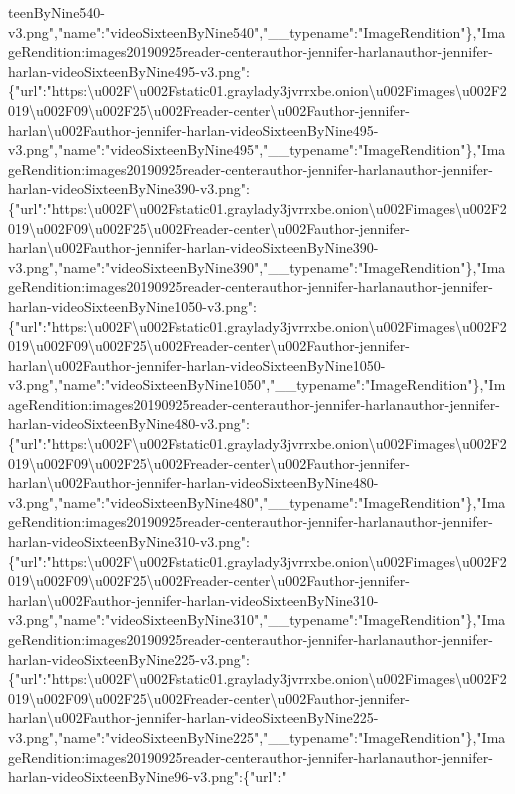 teenByNine540-v3.png","name":"videoSixteenByNine540","\_\_typename":"ImageRendition"\},"ImageRendition:images20190925reader-centerauthor-jennifer-harlanauthor-jennifer-harlan-videoSixteenByNine495-v3.png":\{"url":"https:\textbackslash{}u002F\textbackslash{}u002Fstatic01.graylady3jvrrxbe.onion\textbackslash{}u002Fimages\textbackslash{}u002F2019\textbackslash{}u002F09\textbackslash{}u002F25\textbackslash{}u002Freader-center\textbackslash{}u002Fauthor-jennifer-harlan\textbackslash{}u002Fauthor-jennifer-harlan-videoSixteenByNine495-v3.png","name":"videoSixteenByNine495","\_\_typename":"ImageRendition"\},"ImageRendition:images20190925reader-centerauthor-jennifer-harlanauthor-jennifer-harlan-videoSixteenByNine390-v3.png":\{"url":"https:\textbackslash{}u002F\textbackslash{}u002Fstatic01.graylady3jvrrxbe.onion\textbackslash{}u002Fimages\textbackslash{}u002F2019\textbackslash{}u002F09\textbackslash{}u002F25\textbackslash{}u002Freader-center\textbackslash{}u002Fauthor-jennifer-harlan\textbackslash{}u002Fauthor-jennifer-harlan-videoSixteenByNine390-v3.png","name":"videoSixteenByNine390","\_\_typename":"ImageRendition"\},"ImageRendition:images20190925reader-centerauthor-jennifer-harlanauthor-jennifer-harlan-videoSixteenByNine1050-v3.png":\{"url":"https:\textbackslash{}u002F\textbackslash{}u002Fstatic01.graylady3jvrrxbe.onion\textbackslash{}u002Fimages\textbackslash{}u002F2019\textbackslash{}u002F09\textbackslash{}u002F25\textbackslash{}u002Freader-center\textbackslash{}u002Fauthor-jennifer-harlan\textbackslash{}u002Fauthor-jennifer-harlan-videoSixteenByNine1050-v3.png","name":"videoSixteenByNine1050","\_\_typename":"ImageRendition"\},"ImageRendition:images20190925reader-centerauthor-jennifer-harlanauthor-jennifer-harlan-videoSixteenByNine480-v3.png":\{"url":"https:\textbackslash{}u002F\textbackslash{}u002Fstatic01.graylady3jvrrxbe.onion\textbackslash{}u002Fimages\textbackslash{}u002F2019\textbackslash{}u002F09\textbackslash{}u002F25\textbackslash{}u002Freader-center\textbackslash{}u002Fauthor-jennifer-harlan\textbackslash{}u002Fauthor-jennifer-harlan-videoSixteenByNine480-v3.png","name":"videoSixteenByNine480","\_\_typename":"ImageRendition"\},"ImageRendition:images20190925reader-centerauthor-jennifer-harlanauthor-jennifer-harlan-videoSixteenByNine310-v3.png":\{"url":"https:\textbackslash{}u002F\textbackslash{}u002Fstatic01.graylady3jvrrxbe.onion\textbackslash{}u002Fimages\textbackslash{}u002F2019\textbackslash{}u002F09\textbackslash{}u002F25\textbackslash{}u002Freader-center\textbackslash{}u002Fauthor-jennifer-harlan\textbackslash{}u002Fauthor-jennifer-harlan-videoSixteenByNine310-v3.png","name":"videoSixteenByNine310","\_\_typename":"ImageRendition"\},"ImageRendition:images20190925reader-centerauthor-jennifer-harlanauthor-jennifer-harlan-videoSixteenByNine225-v3.png":\{"url":"https:\textbackslash{}u002F\textbackslash{}u002Fstatic01.graylady3jvrrxbe.onion\textbackslash{}u002Fimages\textbackslash{}u002F2019\textbackslash{}u002F09\textbackslash{}u002F25\textbackslash{}u002Freader-center\textbackslash{}u002Fauthor-jennifer-harlan\textbackslash{}u002Fauthor-jennifer-harlan-videoSixteenByNine225-v3.png","name":"videoSixteenByNine225","\_\_typename":"ImageRendition"\},"ImageRendition:images20190925reader-centerauthor-jennifer-harlanauthor-jennifer-harlan-videoSixteenByNine96-v3.png":\{"url":"